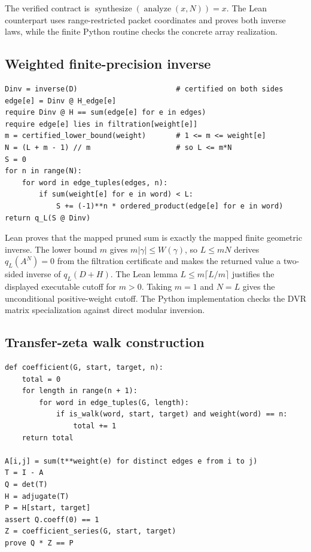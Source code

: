 \documentclass[11pt]{article}
\theoremstyle{definition}
\theoremstyle{remark}
\begin{document}
The verified contract is
$\operatorname{synthesize}(\operatorname{analyze}(x,N))=x$. The Lean
counterpart uses range-restricted packet coordinates and proves both inverse
laws, while the finite Python routine checks the concrete array realization.

\subsection{Weighted finite-precision inverse}\label{alg:weighted-inverse}

\begin{lstlisting}
Dinv = inverse(D)                       # certified on both sides
edge[e] = Dinv @ H_edge[e]
require Dinv @ H == sum(edge[e] for e in edges)
require edge[e] lies in filtration[weight[e]]
m = certified_lower_bound(weight)       # 1 <= m <= weight[e]
N = (L + m - 1) // m                    # so L <= m*N
S = 0
for n in range(N):
    for word in edge_tuples(edges, n):
        if sum(weight[e] for e in word) < L:
            S += (-1)**n * ordered_product(edge[e] for e in word)
return q_L(S @ Dinv)
\end{lstlisting}

Lean proves that the mapped pruned sum is exactly the mapped finite geometric
inverse. The lower bound $m$ gives $m|\gamma|\le W(\gamma)$, so
$L\le mN$ derives $q_L(A^N)=0$ from the filtration certificate and makes the
returned value a two-sided inverse of $q_L(D+H)$. The Lean lemma
$L\le m\lceil L/m\rceil$ justifies the displayed executable cutoff for
$m>0$. Taking $m=1$ and $N=L$ gives
the unconditional positive-weight cutoff. The Python implementation checks the
DVR matrix specialization against direct modular inversion.

\subsection{Transfer-zeta walk construction}\label{alg:path-zeta}

\begin{lstlisting}
def coefficient(G, start, target, n):
    total = 0
    for length in range(n + 1):
        for word in edge_tuples(G, length):
            if is_walk(word, start, target) and weight(word) == n:
                total += 1
    return total

A[i,j] = sum(t**weight(e) for distinct edges e from i to j)
T = I - A
Q = det(T)
H = adjugate(T)
P = H[start, target]
assert Q.coeff(0) == 1
Z = coefficient_series(G, start, target)
prove Q * Z == P
\end{lstlisting}
\end{document}
